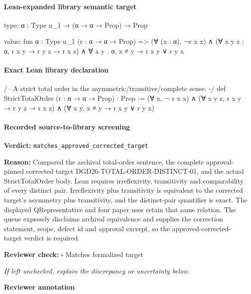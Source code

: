 \documentclass[10pt]{article}
\newcommand{\reviewerbox}{%
  \par\noindent\fbox{\parbox{0.96\linewidth}{\rule{0pt}{0.38in}}}\par
}
\newcommand{\reviewmatch}[1]{%
  \par\noindent\textbf{Reviewer check:} $\square$\; #1\par
  \noindent\emph{If left unchecked, explain the discrepancy or uncertainty below.}\par
}
\begin{document}
\paragraph{Lean-expanded library semantic target}
\begin{ReviewVerbatim}
type:
{α : Type u_1} → (α → α → Prop) → Prop

value:
fun {α : Type u_1} (r : α → α → Prop) =>
  (∀ (x : α), ¬r x x) ∧ (∀ {x y z : α}, r x y → r y z → r x z) ∧ ∀ {x y : α}, x ≠ y → r x y ∨ r y x
\end{ReviewVerbatim}

\paragraph{Exact Lean library declaration}
\begin{ReviewVerbatim}
/-- A strict total order in the asymmetric/transitive/complete sense. -/
def StrictTotalOrder (r : α → α → Prop) : Prop :=
  (∀ x, ¬ r x x) ∧
    (∀ {x y z}, r x y → r y z → r x z) ∧
      (∀ {x y}, x ≠ y → r x y ∨ r y x)
\end{ReviewVerbatim}

\paragraph{Recorded source-to-library screening}
\textbf{Verdict:} \texttt{matches\_approved\_corrected\_target}
\\
{\raggedright
\textbf{Reason:} Compared the archival total-\allowbreak{}order sentence, the complete approval-\allowbreak{}pinned corrected target DGD26-\allowbreak{}TOTAL-\allowbreak{}ORDER-\allowbreak{}DISTINCT-\allowbreak{}01, and the actual StrictTotalOrder body.\allowbreak{} Lean requires irreflexivity, transitivity and comparability of every distinct pair.\allowbreak{} Irreflexivity plus transitivity is equivalent to the corrected target's asymmetry plus transitivity, and the distinct-\allowbreak{}pair quantifier is exact.\allowbreak{} The displayed QRepresentative and four paper uses retain that same relation.\allowbreak{} The queue expressly disclaims archival equivalence and supplies the correction statement, scope, defect id and approval excerpt, so the approved-\allowbreak{}corrected-\allowbreak{}target verdict is required.\allowbreak{}
\par}
\reviewmatch{Matches formalized target}
\noindent\textbf{Reviewer annotation}\par
\reviewerbox
\clearpage
\hypertarget{library-prerequisite-c73fa8cf2f53993d}{}
\end{document}
